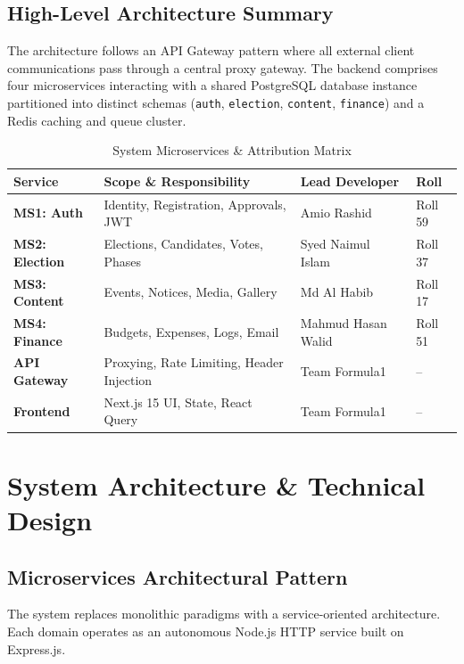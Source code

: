\documentclass[12pt, a4paper]{report}
\begin{document}
\section{High-Level Architecture Summary}
The architecture follows an API Gateway pattern where all external client communications pass through a central proxy gateway. The backend comprises four microservices interacting with a shared PostgreSQL database instance partitioned into distinct schemas (\texttt{auth}, \texttt{election}, \texttt{content}, \texttt{finance}) and a Redis caching and queue cluster.

\begin{table}[h!]
\centering
\caption{System Microservices \& Attribution Matrix}
\label{tab:team_attribution}
\begin{tabular}{@{}llll@{}}
\toprule
\textbf{Service} & \textbf{Scope \& Responsibility} & \textbf{Lead Developer} & \textbf{Roll} \\ \midrule
\textbf{MS1: Auth} & Identity, Registration, Approvals, JWT & Amio Rashid & Roll 59 \\
\textbf{MS2: Election} & Elections, Candidates, Votes, Phases & Syed Naimul Islam & Roll 37 \\
\textbf{MS3: Content} & Events, Notices, Media, Gallery & Md Al Habib & Roll 17 \\
\textbf{MS4: Finance} & Budgets, Expenses, Logs, Email & Mahmud Hasan Walid & Roll 51 \\
\textbf{API Gateway} & Proxying, Rate Limiting, Header Injection & Team Formula1 & -- \\
\textbf{Frontend} & Next.js 15 UI, State, React Query & Team Formula1 & -- \\ \bottomrule
\end{tabular}
\end{table}

\chapter{System Architecture \& Technical Design}

\section{Microservices Architectural Pattern}
The system replaces monolithic paradigms with a service-oriented architecture. Each domain operates as an autonomous Node.js HTTP service built on Express.js.
\end{document}
